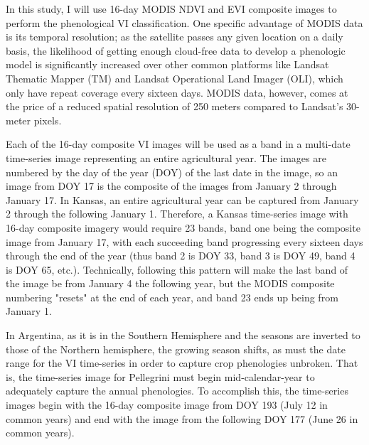 In this study, I will use 16-day MODIS NDVI and EVI composite images to perform the phenological VI classification. One specific advantage of MODIS data is its temporal resolution; as the satellite passes any given location on a daily basis, the likelihood of getting enough cloud-free data to develop a phenologic model is significantly increased over other common platforms like Landsat Thematic Mapper (TM) and Landsat Operational Land Imager (OLI), which only have repeat coverage every sixteen days. MODIS data, however, comes at the price of a reduced spatial resolution of 250 meters compared to Landsat’s 30-meter pixels.

Each of the 16-day composite VI images will be used as a band in a multi-date time-series image representing an entire agricultural year. The images are numbered by the day of the year (DOY) of the last date in the image, so an image from DOY 17 is the composite of the images from January 2 through January 17. In Kansas, an entire agricultural year can be captured from January 2 through the following January 1. Therefore, a Kansas time-series image with 16-day composite imagery would require 23 bands, band one being the composite image from January 17, with each succeeding band progressing every sixteen days through the end of the year (thus band 2 is DOY 33, band 3 is DOY 49, band 4 is DOY 65, etc.). Technically, following this pattern will make the last band of the image be from January 4 the following year, but the MODIS composite numbering "resets" at the end of each year, and band 23 ends up being from January 1.

In Argentina, as it is in the Southern Hemisphere and the seasons are inverted to those of the Northern hemisphere, the growing season shifts, as must the date range for the VI time-series in order to capture crop phenologies unbroken. That is, the time-series image for Pellegrini must begin mid-calendar-year to adequately capture the annual phenologies. To accomplish this, the time-series images begin with the 16-day composite image from DOY 193 (July 12 in common years) and end with the image from the following DOY 177 (June 26 in common years).

